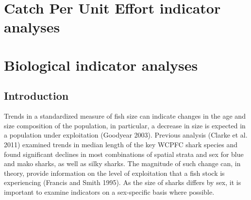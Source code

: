 \documentclass[12pt]{SCreport}
\begin{document}
\section{Catch Per Unit Effort indicator analyses}




\clearpage
      
\section{Biological indicator analyses}


      \subsection{Introduction}
Trends in a standardized measure of fish size can indicate changes in the age and size composition of the population, in particular, a decrease in size is expected in a population under exploitation (Goodyear 2003).  Previous analysis (Clarke et al. 2011) examined trends in median length of the key WCPFC shark species and found significant declines in most combinations of spatial strata and sex for blue and mako sharks, as well as silky sharks.  The magnitude of such change can, in theory, provide information on the level of exploitation that a fish stock is experiencing (Francis and Smith 1995). As the size of sharks differs by sex, it is important to examine indicators on a sex-specific basis where possible. 
\end{document}
